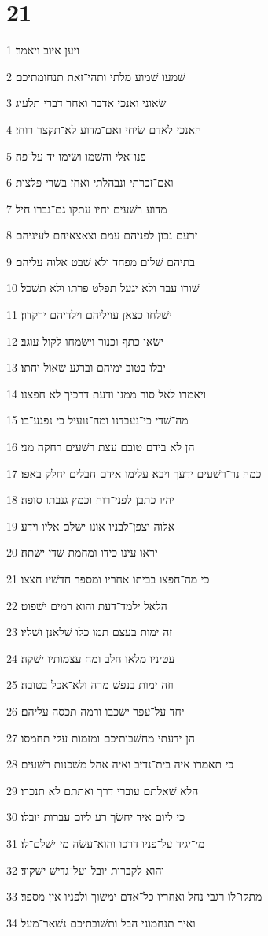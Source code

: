 \chapter{21}

\par 1 ויען איוב ויאמר׃
\par 2 שׁמעו שׁמוע מלתי ותהי־זאת תנחומתיכם׃
\par 3 שׂאוני ואנכי אדבר ואחר דברי תלעיג׃
\par 4 האנכי לאדם שׂיחי ואם־מדוע לא־תקצר רוחי׃
\par 5 פנו־אלי והשׁמו ושׂימו יד על־פה׃
\par 6 ואם־זכרתי ונבהלתי ואחז בשׂרי פלצות׃
\par 7 מדוע רשׁעים יחיו עתקו גם־גברו חיל׃
\par 8 זרעם נכון לפניהם עמם וצאצאיהם לעיניהם׃
\par 9 בתיהם שׁלום מפחד ולא שׁבט אלוה עליהם׃
\par 10 שׁורו עבר ולא יגעל תפלט פרתו ולא תשׁכל׃
\par 11 ישׁלחו כצאן עויליהם וילדיהם ירקדון׃
\par 12 ישׂאו כתף וכנור וישׂמחו לקול עוגב׃
\par 13 יבלו בטוב ימיהם וברגע שׁאול יחתו׃
\par 14 ויאמרו לאל סור ממנו ודעת דרכיך לא חפצנו׃
\par 15 מה־שׁדי כי־נעבדנו ומה־נועיל כי נפגע־בו׃
\par 16 הן לא בידם טובם עצת רשׁעים רחקה מני׃
\par 17 כמה נר־רשׁעים ידעך ויבא עלימו אידם חבלים יחלק באפו׃
\par 18 יהיו כתבן לפני־רוח וכמץ גנבתו סופה׃
\par 19 אלוה יצפן־לבניו אונו ישׁלם אליו וידע׃
\par 20 יראו עינו כידו ומחמת שׁדי ישׁתה׃
\par 21 כי מה־חפצו בביתו אחריו ומספר חדשׁיו חצצו׃
\par 22 הלאל ילמד־דעת והוא רמים ישׁפוט׃
\par 23 זה ימות בעצם תמו כלו שׁלאנן ושׁליו׃
\par 24 עטיניו מלאו חלב ומח עצמותיו ישׁקה׃
\par 25 וזה ימות בנפשׁ מרה ולא־אכל בטובה׃
\par 26 יחד על־עפר ישׁכבו ורמה תכסה עליהם׃
\par 27 הן ידעתי מחשׁבותיכם ומזמות עלי תחמסו׃
\par 28 כי תאמרו איה בית־נדיב ואיה אהל משׁכנות רשׁעים׃
\par 29 הלא שׁאלתם עוברי דרך ואתתם לא תנכרו׃
\par 30 כי ליום איד יחשׂך רע ליום עברות יובלו׃
\par 31 מי־יגיד על־פניו דרכו והוא־עשׂה מי ישׁלם־לו׃
\par 32 והוא לקברות יובל ועל־גדישׁ ישׁקוד׃
\par 33 מתקו־לו רגבי נחל ואחריו כל־אדם ימשׁוך ולפניו אין מספר׃
\par 34 ואיך תנחמוני הבל ותשׁובתיכם נשׁאר־מעל׃

